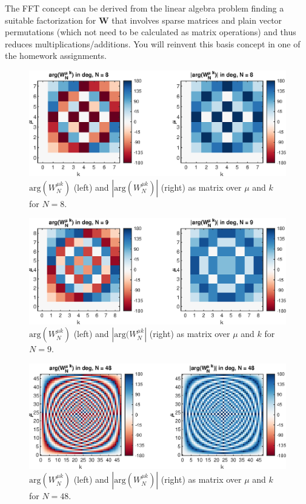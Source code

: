 \documentclass[11pt,a4paper,DIV=12]{scrartcl}
\begin{document}
The FFT concept can be derived from the linear algebra problem finding a
suitable factorization for $\mathbf{W}$ that involves sparse matrices and plain
vector permutations (which not need to be calculated as matrix operations) and
thus reduces multiplications/additions.
%
You will reinvent this basis concept in one of the homework assignments.


\begin{figure}[t]
		\centering
		\includegraphics[]{graphics/TwiddleFactorMatrix_N8}
		\caption{$\text{arg}(W_N^{\mu k})$ (left) and $|\text{arg}(W_N^{\mu k})|$
		(right) as matrix over $\mu$ and $k$ for $N=8$.}
		\label{Twiddle1}
\end{figure}
\begin{figure}[t]
		\centering
		\includegraphics[]{graphics/TwiddleFactorMatrix_N9}
		\caption{$\text{arg}(W_N^{\mu k})$ (left) and $|\text{arg}(W_N^{\mu k}|$
		(right) as matrix over $\mu$ and $k$ for $N=9$.}
		\label{Twiddle2}
\end{figure}
\begin{figure}
		\centering
		\includegraphics[]{graphics/TwiddleFactorMatrix_N48}
		\caption{$\text{arg}(W_N^{\mu k})$ (left) and $|\text{arg}(W_N^{\mu k})|$
		(right) as matrix over $\mu$ and $k$ for $N=48$.}
		\label{Twiddle3}
\end{figure}
\end{document}
